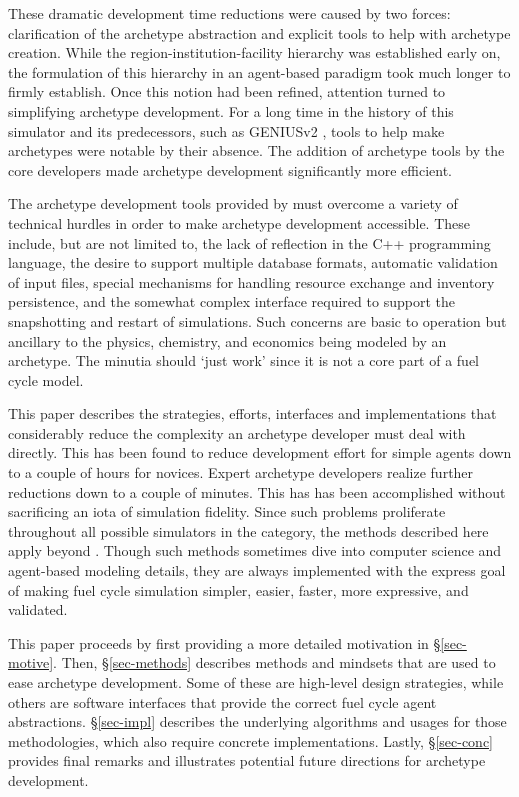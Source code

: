These dramatic development time reductions were caused by two forces:
clarification of the archetype abstraction and explicit tools to help with 
archetype creation. While the region-institution-facility hierarchy was established 
early on, the formulation of this hierarchy in an agent-based paradigm took much 
longer to firmly establish.  Once this notion had been refined, attention turned to 
simplifying \Cyclus archetype development.
For a long time in the history of this simulator and its predecessors, such as 
\gls{GENIUSv2} \cite{oliver_studying_2009}, tools to help make archetypes were notable by their 
absence. 
The addition of archetype tools by the \cyclus core developers made archetype
development significantly more efficient.

The archetype development tools provided by \cyclus must overcome a variety of 
technical hurdles in order to make archetype development accessible.  These 
include, but are not limited to, the lack of reflection in the C++ programming language,
the desire to support multiple database formats, automatic validation of input files,
special mechanisms for handling resource exchange and inventory persistence, 
and the somewhat complex interface required to support the snapshotting and 
restart of simulations. Such concerns are basic to \cyclus operation but 
ancillary to the physics, chemistry, and economics being modeled by an archetype.
The minutia should `just work' since it is not a core part of a fuel cycle model.

This paper describes the strategies, efforts, interfaces
and implementations that considerably reduce the complexity  
an archetype developer must deal with directly. This has been 
found to reduce development effort for simple agents down to a couple 
of hours for novices. Expert archetype developers realize further 
reductions down to a couple of minutes. This has has been accomplished 
without sacrificing an iota of simulation fidelity. Since such 
problems proliferate throughout all possible simulators in 
the \cyclus category, the methods described here apply beyond \cyclus.
Though such methods sometimes dive into 
computer science and agent-based modeling details, they are always implemented
with the express goal of making fuel cycle simulation 
simpler, easier, faster, more expressive, and validated.

This paper proceeds by first providing a more detailed motivation 
in \S \ref{sec-motive}. Then, \S \ref{sec-methods} describes
methods and mindsets that are used to ease archetype development.
Some of these are high-level design strategies, while others are software 
interfaces that 
provide the correct fuel cycle agent abstractions. 
\S \ref{sec-impl} describes the underlying algorithms and usages
for those methodologies, which also require concrete implementations.
Lastly, \S \ref{sec-conc} provides final remarks and illustrates
potential future directions for \cyclus archetype development.
